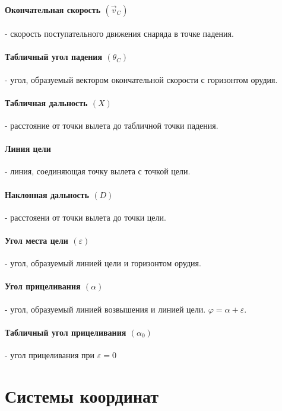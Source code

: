 \paragraph{Окончательная скорость $(\vec{v}_C)$ }- скорость поступательного движения снаряда в точке падения.

\paragraph{Табличный угол падения $(\theta_C)$ }- угол, образуемый вектором окончательной скорости с горизонтом орудия.

\paragraph{Табличная дальность $(X)$ }- расстояние от точки вылета до табличной точки падения.

\paragraph{Линия цели }- линия, соединяющая точку вылета с точкой цели.

\paragraph{Наклонная дальность $(D)$ }- расстояени от точки вылета до точки цели.

\paragraph{Угол места цели $(\varepsilon)$ }- угол, образуемый линией цели и горизонтом орудия.

\paragraph{Угол прицеливания $(\alpha)$ }- угол, образуемый линией возвышения и линией цели. $\varphi = \alpha + \varepsilon$.

\paragraph{Табличный угол прицеливания $(\alpha_0)$ }- угол прицеливания при $\varepsilon = 0$

\section{Системы координат}

